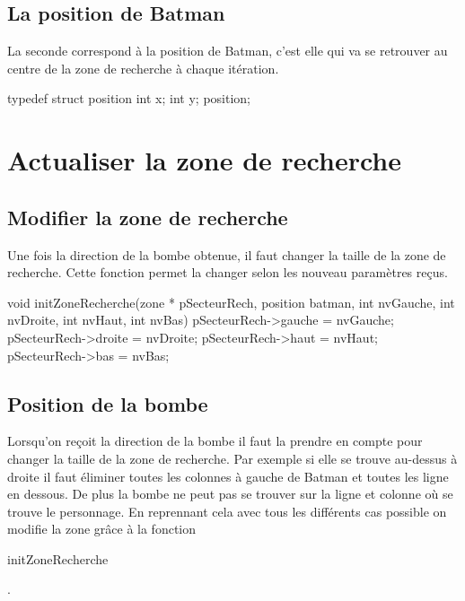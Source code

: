 \documentclass{article}
\begin{document}
\subsection{La position de Batman}
La seconde correspond à la position de Batman, c'est elle qui va se retrouver au centre de la zone de recherche à chaque itération.
\\

\begin{boxedverbatim}
typedef struct position
{
  int x;
  int y;
} position;
\end{boxedverbatim}


\section{Actualiser la zone de recherche}

\subsection{Modifier la zone de recherche}
Une fois la direction de la bombe obtenue, il faut changer la taille de la zone de recherche. Cette fonction permet la changer selon les nouveau paramètres reçus.
\\

\begin{boxedverbatim}
void initZoneRecherche(zone * pSecteurRech, position batman, int nvGauche,
  int nvDroite, int nvHaut, int nvBas)
{
  pSecteurRech->gauche = nvGauche;
  pSecteurRech->droite = nvDroite;
  pSecteurRech->haut = nvHaut;
  pSecteurRech->bas = nvBas;
}
\end{boxedverbatim}

\subsection{Position de la bombe}
Lorsqu'on reçoit la direction de la bombe il faut la prendre en compte pour changer la taille de la zone de recherche. Par exemple si elle se trouve au-dessus à droite il faut éliminer toutes les colonnes à gauche de Batman et toutes les ligne en dessous. De plus la bombe ne peut pas se trouver sur la ligne et colonne où se trouve le personnage. En reprennant cela avec tous les différents cas possible on modifie la zone grâce à la fonction
\begin{boxedverbatim}
initZoneRecherche
\end{boxedverbatim}
.\\
\end{document}
